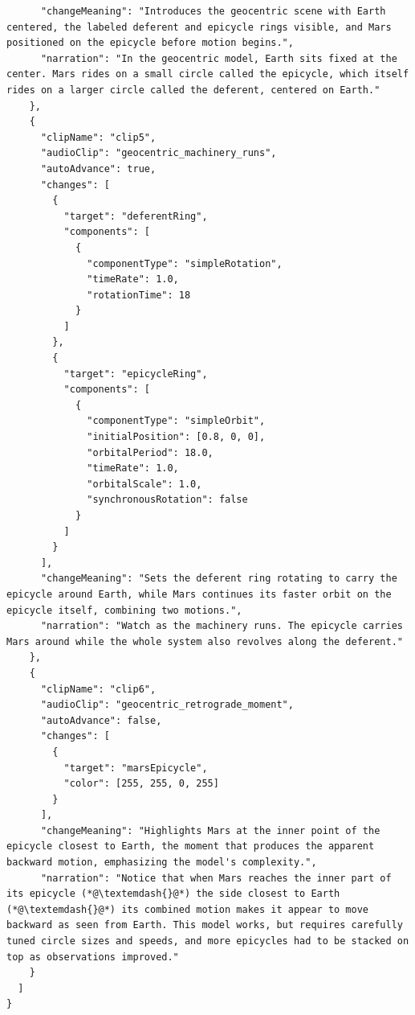 \begin{lstlisting}
      "changeMeaning": "Introduces the geocentric scene with Earth centered, the labeled deferent and epicycle rings visible, and Mars positioned on the epicycle before motion begins.",
      "narration": "In the geocentric model, Earth sits fixed at the center. Mars rides on a small circle called the epicycle, which itself rides on a larger circle called the deferent, centered on Earth."
    },
    {
      "clipName": "clip5",
      "audioClip": "geocentric_machinery_runs",
      "autoAdvance": true,
      "changes": [
        {
          "target": "deferentRing",
          "components": [
            {
              "componentType": "simpleRotation",
              "timeRate": 1.0,
              "rotationTime": 18
            }
          ]
        },
        {
          "target": "epicycleRing",
          "components": [
            {
              "componentType": "simpleOrbit",
              "initialPosition": [0.8, 0, 0],
              "orbitalPeriod": 18.0,
              "timeRate": 1.0,
              "orbitalScale": 1.0,
              "synchronousRotation": false
            }
          ]
        }
      ],
      "changeMeaning": "Sets the deferent ring rotating to carry the epicycle around Earth, while Mars continues its faster orbit on the epicycle itself, combining two motions.",
      "narration": "Watch as the machinery runs. The epicycle carries Mars around while the whole system also revolves along the deferent."
    },
    {
      "clipName": "clip6",
      "audioClip": "geocentric_retrograde_moment",
      "autoAdvance": false,
      "changes": [
        {
          "target": "marsEpicycle",
          "color": [255, 255, 0, 255]
        }
      ],
      "changeMeaning": "Highlights Mars at the inner point of the epicycle closest to Earth, the moment that produces the apparent backward motion, emphasizing the model's complexity.",
      "narration": "Notice that when Mars reaches the inner part of its epicycle (*@\textemdash{}@*) the side closest to Earth (*@\textemdash{}@*) its combined motion makes it appear to move backward as seen from Earth. This model works, but requires carefully tuned circle sizes and speeds, and more epicycles had to be stacked on top as observations improved."
    }
  ]
}
\end{lstlisting}

